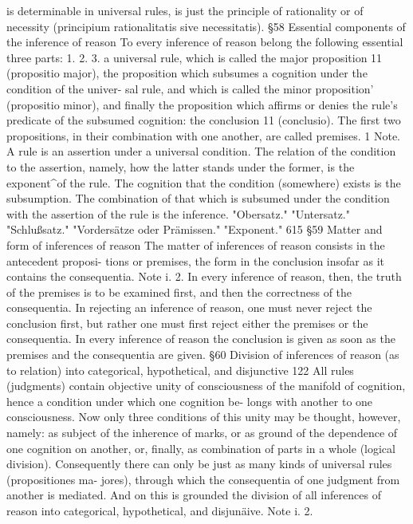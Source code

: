 is determinable in universal rules, is just the principle of rationality or of
necessity (principium rationalitatis sive necessitatis).
§58
Essential components of the inference of reason
To every inference of reason belong the following essential three parts:
1.
2.
3.
a universal rule, which is called the major proposition 11 (propositio major),
the proposition which subsumes a cognition under the condition of the univer-
sal rule, and which is called the minor proposition' (propositio minor), and finally
the proposition which affirms or denies the rule's predicate of the subsumed
cognition: the conclusion 11 (conclusio).
The first two propositions, in their combination with one another, are
called premises. 1
Note.
A rule is an assertion under a universal condition. The relation of the
condition to the assertion, namely, how the latter stands under the former,
is the exponent^of the rule.
The cognition that the condition (somewhere) exists is the subsumption.
The combination of that which is subsumed under the condition with
the assertion of the rule is the inference.
"Obersatz."
"Untersatz."
"Schlußsatz."
"Vordersätze oder Prämissen."
"Exponent."
615
§59
Matter and form of inferences of reason
The matter of inferences of reason consists in the antecedent proposi-
tions or premises, the form in the conclusion insofar as it contains the
consequentia.
Note i.
2.
In every inference of reason, then, the truth of the premises is to be
examined first, and then the correctness of the consequentia. In rejecting
an inference of reason, one must never reject the conclusion first, but
rather one must first reject either the premises or the consequentia.
In every inference of reason the conclusion is given as soon as the
premises and the consequentia are given.
§60
Division of inferences of reason (as to relation) into categorical,
hypothetical, and disjunctive
122
All rules (judgments) contain objective unity of consciousness of the
manifold of cognition, hence a condition under which one cognition be-
longs with another to one consciousness. Now only three conditions of
this unity may be thought, however, namely: as subject of the inherence of
marks, or as ground of the dependence of one cognition on another, or,
finally, as combination of parts in a whole (logical division). Consequently
there can only be just as many kinds of universal rules (propositiones ma-
jores), through which the consequentia of one judgment from another is
mediated.
And on this is grounded the division of all inferences of reason into
categorical, hypothetical, and disjunäive.
Note i.
2.
